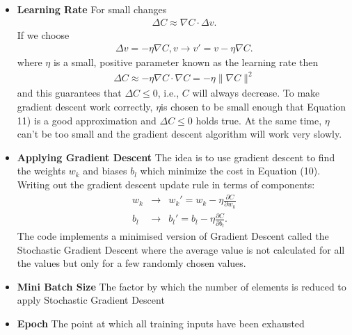 \documentclass[a4paper, oneside,11pt]{article}
\begin{document}
\begin{itemize}
	\item \textbf{Learning Rate}
		For small changes
		\begin{eqnarray} 
		  \Delta C \approx \nabla C \cdot \Delta v.
		\end{eqnarray}
		If we choose
		\begin{eqnarray} 
		  \Delta v = -\eta \nabla C,
		  v \rightarrow v' = v-\eta \nabla C.
		\end{eqnarray}
		where \begin{math}\eta\end{math} is a small, positive parameter known as the learning rate then
		\begin{eqnarray}
		  \Delta C \approx -\eta
		  \nabla C \cdot \nabla C = -\eta \|\nabla C\|^2
		\end{eqnarray}
		and this guarantees that \begin{math}\Delta C \leq 0\end{math}, i.e., \begin{math}C\end{math} will always decrease. To make gradient descent work correctly, \begin{math}\eta\end{math}is chosen to be small enough that Equation 11) is a good approximation and \begin{math}\Delta C \leq 0\end{math} holds true. At the same time, \begin{math}\eta\end{math} can't be too small and the gradient descent algorithm will work very slowly.

	\item \textbf{Applying Gradient Descent}
		The idea is to use gradient descent to find the weights \begin{math}w_k\end{math} and biases \begin{math}b_l\end{math} which minimize the cost in Equation (10). Writing out the gradient descent update rule in terms of components:
		\begin{eqnarray}
		  w_k & \rightarrow & w_k' = w_k-\eta \frac{\partial C}{\partial w_k} \\
		  b_l & \rightarrow & b_l' = b_l-\eta \frac{\partial C}{\partial b_l}.
		\end{eqnarray}
		The code implements a minimised version of Gradient Descent called the Stochastic Gradient Descent where the average value is not calculated for all the values but only for a few randomly chosen values.
	\item \textbf{Mini Batch Size}
		The factor by which the number of elements is reduced to apply Stochastic Gradient Descent
	\item \textbf{Epoch}
		The point at which all training inputs have been exhausted
\end{itemize}

\printbibliography 
\end{document}
